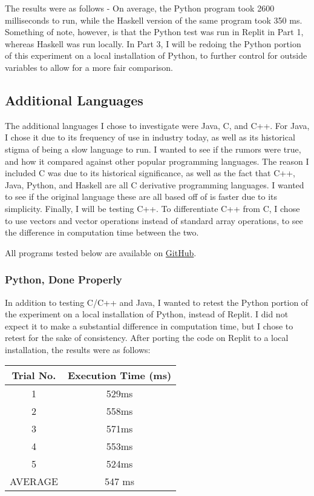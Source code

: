 \documentclass{article}
\begin{document}
    \medskip\noindent The results were as follows -  On average, the Python program took 2600 milliseconds to run, while the Haskell version of the same program took 350 ms. Something of note, however, is that the Python test was run in Replit in Part 1, whereas Haskell was run locally. In Part 3, I will be redoing the Python portion of this experiment on a local installation of Python, to further control for outside variables to allow for a more fair comparison. 
    
    \subsection{Additional Languages}
    
    \medskip\noindent The additional languages I chose to investigate were Java, C, and C++. For Java, I chose it due to its frequency of use in industry today, as well as its historical stigma of being a slow language to run. I wanted to see if the rumors were true, and how it compared against other popular programming languages. The reason I included C was due to its historical significance, as well as the fact that C++, Java, Python, and Haskell are all C derivative programming languages. I wanted to see if the original language these are all based off of is faster due to its simplicity. Finally, I will be testing C++. To differentiate C++ from C, I chose to use vectors and vector operations instead of standard array operations, to see the difference in computation time between the two. 
    
    \medskip\noindent All programs tested below are available on \href {https://github.com/ehombledal/ProgLang354/tree/main/Report/ProjectCode}{GitHub}.
        \subsubsection{Python, Done Properly}
    
    \medskip\noindent In addition to testing C/C++ and Java, I wanted to retest the Python portion of the experiment on a local installation of Python, instead of Replit. I did not expect it to make a substantial difference in computation time, but I chose to retest for the sake of consistency. After porting the code on Replit to a local installation, the results were as follows: 
    
                \begin{center}
    \begin{tabular}{||c c|} 
    \hline
   Trial No. & Execution Time (ms)\\ [0.5ex] 
    \hline\hline
    1 & 529ms \\ 
     \hline
    2 & 558ms \\
     \hline
    3 & 571ms\\
    \hline
    4 & 553ms\\ 
     \hline
    5 & 524ms\\
    \hline\hline
    AVERAGE & 547 ms\\
    \hline
    \end{tabular}
    \end{center}
    
\end{document}
